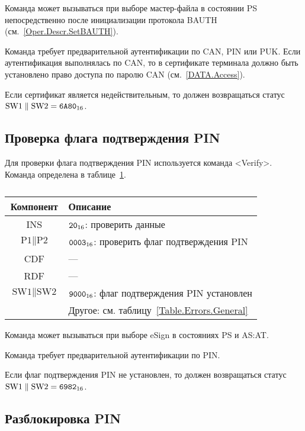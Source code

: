 Команда может вызываться при выборе мастер-файла
в состоянии PS непосредственно после 
инициализации протокола BAUTH (см.~\ref{Oper.Descr.SetBAUTH}).

Команда требует предварительной аутентификации по CAN, PIN или PUK. 
Если аутентификация выполнялась по CAN,
то в сертификате терминала должно быть установлено 
право доступа по паролю CAN (см.~\ref{DATA.Access}).

Если сертификат является недействительным, то должен 
возвращаться статус 
$\text{SW1} \parallel \text{SW2} = \texttt{6A80}_{16}$.

\subsection{Проверка флага подтверждения PIN}
\label{Oper.Descr.VerifyAuth}

Для проверки флага подтверждения PIN используется команда <Verify>.
Команда определена в таблице~\ref{Table.Oper.VerifyAuthCmd}.

\begin{table}[hbt]
\caption{}\label{Table.Oper.VerifyAuthCmd}
\begin{tabular}{|c|p{14cm}|}
\hline
Компонент & Описание \\
\hline
\hline
INS & $\texttt{20}_{16}$: проверить данные\\
\hline
$\text{P1} \parallel \text{P2}$ & $\texttt{0003}_{16}$: проверить 
флаг подтверждения PIN\\
\hline
CDF & --- \\
\hline 
RDF &  --- \\
\hline
$\text{SW1} \parallel \text{SW2}$ & $\texttt{9000}_{16}$: 
флаг подтверждения PIN установлен\\
\cline{2-2}
 & Другое: см. таблицу~\ref{Table.Errors.General} \\
\hline
\end{tabular}
\end{table}

Команда может вызываться при выборе eSign в состояниях PS и AS:AT. 

Команда требует предварительной аутентификации по PIN.

Если флаг подтверждения PIN не установлен, то должен 
возвращаться статус $\text{SW1} \parallel \text{SW2} = \texttt{6982}_{16}$.

\subsection{Разблокировка PIN}
\label{Oper.Descr.UnblockPIN}

